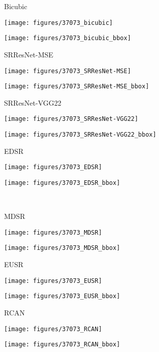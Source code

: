 \documentclass[runningheads]{llncs}
\begin{document}
\begin{figure*}[]
	\centering
	\begin{minipage}[b]{0.24\linewidth}
		\centering
		\centerline{\scriptsize{Bicubic}}\medskip
		\centerline{\texttt{[image: figures/37073\_bicubic]}}\smallskip
		\centerline{\texttt{[image: figures/37073\_bicubic\_bbox]}}
	\end{minipage}
	\begin{minipage}[b]{0.24\linewidth}
		\centering
		\centerline{\scriptsize{SRResNet-MSE}}\medskip
		\centerline{\texttt{[image: figures/37073\_SRResNet-MSE]}}\smallskip
		\centerline{\texttt{[image: figures/37073\_SRResNet-MSE\_bbox]}}
	\end{minipage}
	\begin{minipage}[b]{0.24\linewidth}
		\centering
		\centerline{\scriptsize{SRResNet-VGG22}}\medskip
		\centerline{\texttt{[image: figures/37073\_SRResNet-VGG22]}}\smallskip
		\centerline{\texttt{[image: figures/37073\_SRResNet-VGG22\_bbox]}}
	\end{minipage}
	\begin{minipage}[b]{0.24\linewidth}
		\centering
		\centerline{\scriptsize{EDSR}}\medskip
		\centerline{\texttt{[image: figures/37073\_EDSR]}}\smallskip
		\centerline{\texttt{[image: figures/37073\_EDSR\_bbox]}}
	\end{minipage}
	\medskip \\ \medskip
	\begin{minipage}[b]{0.24\linewidth}
		\centering
		\centerline{\scriptsize{MDSR}}\medskip
		\centerline{\texttt{[image: figures/37073\_MDSR]}}\smallskip
		\centerline{\texttt{[image: figures/37073\_MDSR\_bbox]}}
	\end{minipage}
	\begin{minipage}[b]{0.24\linewidth}
		\centering
		\centerline{\scriptsize{EUSR}}\medskip
		\centerline{\texttt{[image: figures/37073\_EUSR]}}\smallskip
		\centerline{\texttt{[image: figures/37073\_EUSR\_bbox]}}
	\end{minipage}
	\begin{minipage}[b]{0.24\linewidth}
		\centering
		\centerline{\scriptsize{RCAN}}\medskip
		\centerline{\texttt{[image: figures/37073\_RCAN]}}\smallskip
		\centerline{\texttt{[image: figures/37073\_RCAN\_bbox]}}
	\end{minipage}

\end{figure*}
\end{document}
